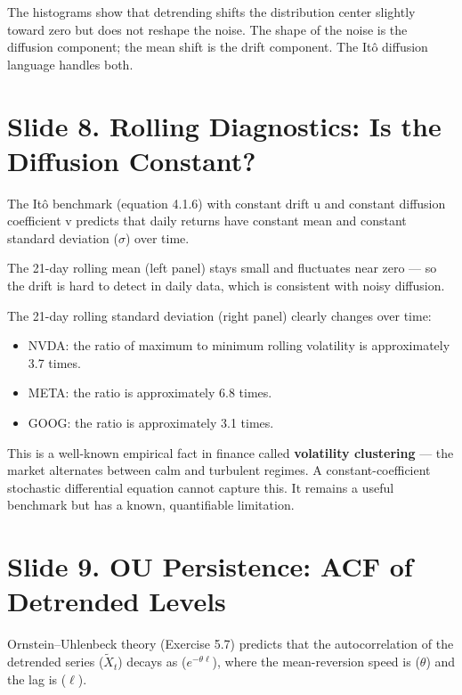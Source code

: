 \documentclass[12pt,a4paper]{article}
\begin{document}
The histograms show that detrending shifts the distribution center slightly toward zero
but does not reshape the noise.
The shape of the noise is the diffusion component;
the mean shift is the drift component.
The Itô diffusion language handles both.

\section{Slide 8. Rolling Diagnostics: Is the Diffusion Constant?}

The Itô benchmark (equation 4.1.6) with constant drift u and constant diffusion
coefficient v predicts that daily returns have constant mean and
constant standard deviation ($\sigma$) over time.

The 21-day rolling mean (left panel) stays small and fluctuates near zero ---
so the drift is hard to detect in daily data, which is consistent with noisy diffusion.

The 21-day rolling standard deviation (right panel) clearly changes over time:
\begin{itemize}
  \item NVDA: the ratio of maximum to minimum rolling volatility
        is approximately 3.7 times.
  \item META: the ratio is approximately 6.8 times.
  \item GOOG: the ratio is approximately 3.1 times.
\end{itemize}

This is a well-known empirical fact in finance called
\textbf{volatility clustering} ---
the market alternates between calm and turbulent regimes.
A constant-coefficient stochastic differential equation cannot capture this.
It remains a useful benchmark but has a known, quantifiable limitation.

\section{Slide 9. OU Persistence: ACF of Detrended Levels}

Ornstein--Uhlenbeck theory (Exercise 5.7) predicts that
the autocorrelation of the detrended series ($\widetilde{X}_t$) decays as ($e^{-\theta\ell}$),
where the mean-reversion speed is ($\theta$)
and the lag is ($\ell$).
\end{document}
